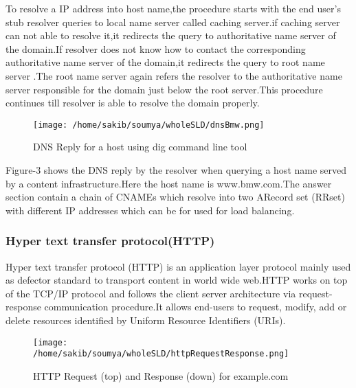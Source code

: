 To resolve a IP address into host name,the procedure starts with the end
user’s stub resolver queries to local name server called caching server.if caching
server can not able to resolve it,it redirects the query to authoritative name server
of the domain.If resolver does not know how to contact the corresponding authoritative name server of the domain,it redirects the query to root name server
.The root name server again refers the resolver to the authoritative name server
responsible for the domain just below the root server.This procedure continues
till resolver is able to resolve the domain properly.

\begin{figure}[h]
\texttt{[image: /home/sakib/soumya/wholeSLD/dnsBmw.png]}
\centering
\caption{DNS Reply for a host using dig command line tool}
\end{figure}

Figure-3 shows the DNS reply by the resolver when querying a host name
served by a content infrastructure.Here the host name is www.bmw.com.The
answer section contain a chain of CNAMEs which resolve into two ARecord set
(RRset) with different IP addresses which can be for used for load balancing.

\subsubsection{Hyper text transfer protocol(HTTP)}
Hyper text transfer protocol (HTTP) is an application layer protocol mainly used
as defector standard to transport content in world wide web.HTTP works on top
of the TCP/IP protocol and follows the client server architecture via request-response communication procedure.It allows end-users to request, modify, add or delete resources identified by Uniform Resource Identifiers (URIs).

\begin{figure}[h]
\texttt{[image: /home/sakib/soumya/wholeSLD/httpRequestResponse.png]}
\centering
\caption{HTTP Request (top) and Response (down) for example.com}
\end{figure}

